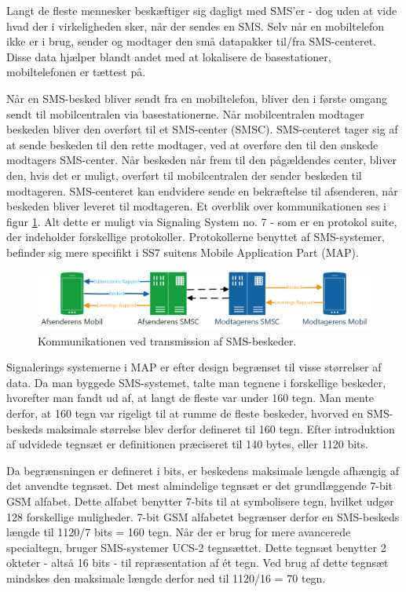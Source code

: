 Langt de fleste mennesker beskæftiger sig dagligt med SMS'er - dog uden at vide hvad der i virkeligheden sker, når der sendes en SMS. Selv når en mobiltelefon ikke er i brug, sender og modtager den små datapakker til/fra SMS-centeret. Disse data hjælper blandt andet med at lokalisere de basestationer, mobiltelefonen er tættest på.

Når en SMS-besked bliver sendt fra en mobiltelefon, bliver den i første omgang sendt til mobilcentralen via basestationerne. Når mobilcentralen modtager beskeden bliver den overført til et SMS-center (SMSC). SMS-centeret tager sig af at sende beskeden til den rette modtager, ved at overføre den til den ønskede modtagers SMS-center. Når beskeden når frem til den pågældendes center, bliver den, hvis det er muligt, overført til mobilcentralen der sender beskeden til modtageren. SMS-centeret kan endvidere sende en bekræftelse til afsenderen, når beskeden bliver leveret til modtageren. Et overblik over kommunikationen ses i figur \ref{smsTransm}. Alt dette er muligt via Signaling System no. 7 - som er en protokol suite, der indeholder forskellige protokoller. Protokollerne benyttet af SMS-systemer, befinder sig mere specifikt i SS7 suitens Mobile Application Part (MAP). \cite{Pro_1} \cite{sms_max1}

\noindent
\begin{figure}[hba]
\includegraphics[width=\linewidth]{Billeder/Mobil.png}
\caption {Kommunikationen ved transmission af SMS-beskeder.}
\label{smsTransm}
\end{figure}

Signalerings systemerne i MAP er efter design begrænset til visse størrelser af data. Da man byggede SMS-systemet, talte man tegnene i forskellige beskeder, hvorefter man fandt ud af, at langt de fleste var under 160 tegn. Man mente derfor, at 160 tegn var rigeligt til at rumme de fleste beskeder, hvorved en SMS-beskeds maksimale størrelse blev derfor defineret til 160 tegn. Efter introduktion af udvidede tegnsæt er definitionen præciseret til 140 bytes, eller 1120 bits. \cite{sms_max1} \cite{sms_max2}


Da begrænsningen er defineret i bits, er beskedens maksimale længde afhængig af det anvendte tegnsæt. Det mest almindelige tegnsæt er det grundlæggende 7-bit GSM alfabet. Dette alfabet benytter 7-bits til at symbolisere tegn, hvilket udgør 128 forskellige muligheder. 7-bit GSM alfabetet begrænser derfor en SMS-beskeds længde til 1120/7 bits = 160 tegn. Når der er brug for mere avancerede specialtegn, bruger SMS-systemer UCS-2 tegnsættet. Dette tegnsæt benytter 2 okteter - altså 16 bits - til repræsentation af ét tegn. Ved brug af dette tegnsæt mindskes den maksimale længde derfor ned til 1120/16 = 70 tegn. \cite{sms_pdu}

